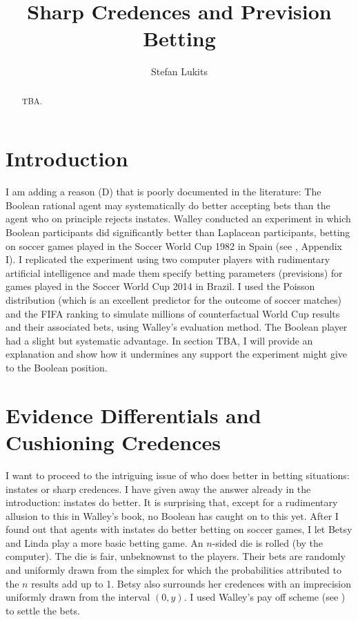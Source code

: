 \documentclass[11pt]{article}
\begin{document}

\title{Sharp Credences and Prevision Betting}
\author{Stefan Lukits}
\date{}
\maketitle

\begin{abstract} 
  {\noindent}TBA.
\end{abstract}

\section{Introduction}
\label{Introduction}

I am adding a reason (D) that is poorly documented in the literature:
The Boolean rational agent may systematically do better accepting bets
than the agent who on principle rejects instates. Walley conducted an
experiment in which Boolean participants did significantly better than
Laplacean participants, betting on soccer games played in the Soccer
World Cup 1982 in Spain (see , Appendix I). I
replicated the experiment using two computer players with rudimentary
artificial intelligence and made them specify betting parameters
(previsions) for games played in the Soccer World Cup 2014 in Brazil.
I used the Poisson distribution (which is an excellent predictor for
the outcome of soccer matches) and the FIFA ranking to simulate
millions of counterfactual World Cup results and their associated
bets, using Walley's evaluation method. The Boolean player had a
slight but systematic advantage. In section TBA, I will provide an
explanation and show how it undermines any support the experiment
might give to the Boolean position.

\section{Evidence Differentials and Cushioning Credences}
\label{WalleysWorldCupWoes}

I want to proceed to the intriguing issue of who does better in
betting situations: instates or sharp credences. I have given away the
answer already in the introduction: instates do better. It is
surprising that, except for a rudimentary allusion to this in Walley's
book, no Boolean has caught on to this yet. After I found out that
agents with instates do better betting on soccer games, I let Betsy
and Linda play a more basic betting game. An $n$-sided die is rolled
(by the computer). The die is fair, unbeknownst to the players. Their
bets are randomly and uniformly drawn from the simplex for which the
probabilities attributed to the $n$ results add up to 1. Betsy also
surrounds her credences with an imprecision uniformly drawn from the
interval $(0,y)$. I used Walley's pay off scheme (see
) to settle the bets.
\end{document}
